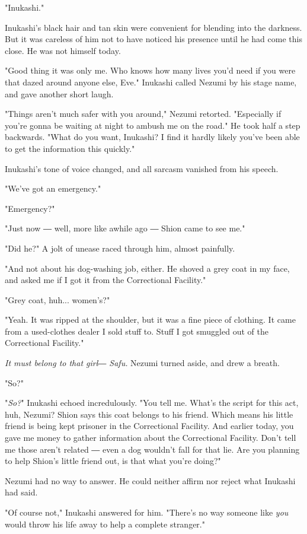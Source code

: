 "Inukashi."

Inukashi's black hair and tan skin were convenient for blending into the
darkness. But it was careless of him not to have noticed his presence
until he had come this close. He was not himself today.

"Good thing it was only me. Who knows how many lives you'd need if you
were that dazed around anyone else, Eve." Inukashi called Nezumi by his
stage name, and gave another short laugh.

"Things aren't much safer with you around," Nezumi retorted. "Especially
if you're gonna be waiting at night to ambush me on the road." He took
half a step backwards. "What do you want, Inukashi? I find it hardly
likely you've been able to get the information this quickly."

Inukashi's tone of voice changed, and all sarcasm vanished from his
speech.

"We've got an emergency."

"Emergency?"

"Just now ― well, more like awhile ago ― Shion came to see me."

"Did he?" A jolt of unease raced through him, almost painfully.

"And not about his dog-washing job, either. He shoved a grey coat in my
face, and asked me if I got it from the Correctional Facility."

"Grey coat, huh... women's?"

"Yeah. It was ripped at the shoulder, but it was a fine piece of
clothing. It came from a used-clothes dealer I sold stuff to. Stuff I
got smuggled out of the Correctional Facility."

\emph{It must belong to that girl― Safu.} Nezumi turned aside, and drew a
breath.

"So?"

"\emph{So?}" Inukashi echoed incredulously. "You tell me. What's the script for
this act, huh, Nezumi? Shion says this coat belongs to his friend. Which
means his little friend is being kept prisoner in the Correctional
Facility. And earlier today, you gave me money to gather information
about the Correctional Facility. Don't tell me those aren't related ―
even a dog wouldn't fall for that lie. Are you planning to help Shion's
little friend out, is that what you're doing?"

Nezumi had no way to answer. He could neither affirm nor reject what
Inukashi had said.

"Of course not," Inukashi answered for him. "There's no way someone like
\emph{you} would throw his life away to help a complete stranger."

